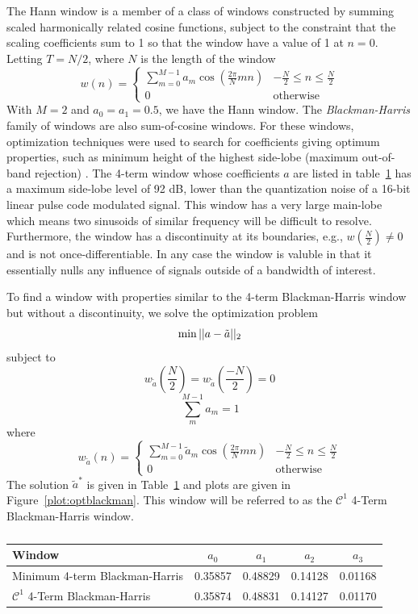 \documentclass[letterpaper,12pt]{report}
\begin{document}
The Hann window is a member of a class of windows constructed by summing scaled
harmonically related cosine functions, subject to the constraint that the
scaling coefficients sum to 1 so that the window have a value of 1 at $n=0$.
Letting $T=N/2$, where $N$ is the length of the window
\[
    w(n) = \begin{cases}
        \sum_{m=0}^{M-1}a_{m}\cos \left( \frac{2\pi}{N}mn \right) & -\frac{N}{2} \leq n
        \leq \frac{N}{2} \\
        0 & \text{otherwise}
    \end{cases}
\]
With $M=2$ and $a_0 = a_1 = 0.5$, we have the Hann window. The
\textit{Blackman-Harris} family of windows are also sum-of-cosine windows. For
these windows, optimization techniques were used to search for coefficients
giving optimum properties, such as minimum height of the highest side-lobe
(maximum out-of-band rejection) \cite{rabiner1970approach}. The 4-term window
whose coefficients $a$ are listed in table~\ref{tab:optblackman} has a maximum
side-lobe level of 92 dB, lower than the quantization noise of a 16-bit linear
pulse code modulated signal. This window has a very large main-lobe which means
two sinusoids of similar frequency will be difficult to resolve. Furthermore,
the window has a discontinuity at its boundaries, e.g.,
$w \left( \frac{N}{2} \right) \neq 0$ and is not once-differentiable. In any
case the window is valuble in that it essentially nulls any influence of signals
outside of a bandwidth of interest.

To find a window with properties similar to the 4-term Blackman-Harris window
but without a discontinuity, we solve the optimization problem
\[
        \min||a-\tilde{a}||_2 \\
\]
subject to
\[
        w_{\tilde{a}} \left( \frac{N}{2} \right)
            = w_{\tilde{a}} \left( \frac{-N}{2} \right) = 0
\]
\[
        \sum_{m}^{M-1} a_{m} = 1
\]
where
\[
    w_{\tilde{a}}(n) = \begin{cases}
        \sum_{m=0}^{M-1}\tilde{a}_{m}\cos \left( \frac{2\pi}{N}mn \right) & -\frac{N}{2} \leq n
        \leq \frac{N}{2} \\
        0 & \text{otherwise}
    \end{cases}
\]
The solution $\tilde{a}^{\ast}$ is given in Table~\ref{tab:optblackman} and
plots are given in Figure~\ref{plot:optblackman}. This window will be referred
to as the $\mathcal{C}^{1}$ 4-Term Blackman-Harris window.

\begin{table}
    \caption{\label{tab:optblackman}}
    \begin{center}
        \begin{tabular}{l c c c c }
            Window & $a_0$ & $a_1$ & $a_2$ & $a_3$ \\
            \hline
            Minimum 4-term Blackman-Harris & 0.35857 & 0.48829 & 0.14128 &
            0.01168 \\
            $\mathcal{C}^{1}$ 4-Term Blackman-Harris & 0.35874 & 0.48831 &
            0.14127 & 0.01170
        \end{tabular}
    \end{center}
\end{table}
\end{document}
